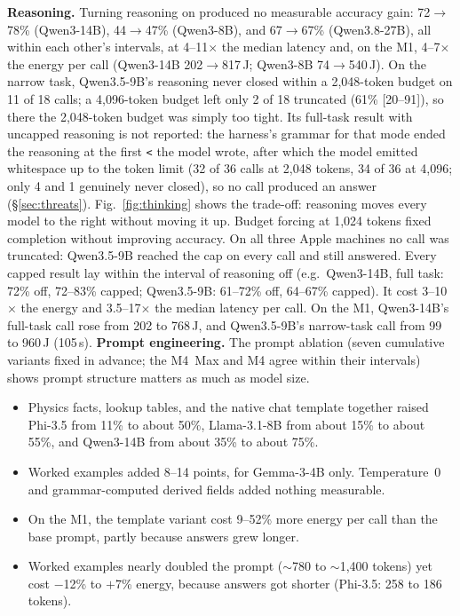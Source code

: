 \documentclass[conference]{IEEEtran}
\begin{document}
\textbf{Reasoning.} Turning reasoning on produced no measurable accuracy gain: 72$\to$78\% (Qwen3-14B), 44$\to$47\% (Qwen3-8B), and 67$\to$67\% (Qwen3.8-27B), all within each other's intervals, at 4--11$\times$ the median latency and, on the M1, 4--7$\times$ the energy per call (Qwen3-14B 202$\to$817\,J; Qwen3-8B 74$\to$540\,J). On the narrow task, Qwen3.5-9B's reasoning never closed within a 2,048-token budget on 11 of 18 calls; a 4,096-token budget left only 2 of 18 truncated (61\% [20--91]), so there the 2,048-token budget was simply too tight. Its full-task result with uncapped reasoning is not reported: the harness's grammar for that mode ended the reasoning at the first \texttt{<} the model wrote, after which the model emitted whitespace up to the token limit (32 of 36 calls at 2,048 tokens, 34 of 36 at 4,096; only 4 and 1 genuinely never closed), so no call produced an answer (\S\ref{sec:threats}). Fig.~\ref{fig:thinking} shows the trade-off: reasoning moves every model to the right without moving it up. Budget forcing at 1,024 tokens fixed completion without improving accuracy. On all three Apple machines no call was truncated: Qwen3.5-9B reached the cap on every call and still answered. Every capped result lay within the interval of reasoning off (e.g.\ Qwen3-14B, full task: 72\% off, 72--83\% capped; Qwen3.5-9B: 61--72\% off, 64--67\% capped). It cost 3--10$\times$ the energy and 3.5--17$\times$ the median latency per call. On the M1, Qwen3-14B's full-task call rose from 202 to 768\,J, and Qwen3.5-9B's narrow-task call from 99 to 960\,J (105\,s). \textbf{Prompt engineering.} The prompt ablation (seven cumulative variants fixed in advance; the M4~Max and M4 agree within their intervals) shows prompt structure matters as much as model size.
\begin{itemize}
\item Physics facts, lookup tables, and the native chat template together raised Phi-3.5 from 11\% to about 50\%, Llama-3.1-8B from about 15\% to about 55\%, and Qwen3-14B from about 35\% to about 75\%.
\item Worked examples added 8--14 points, for Gemma-3-4B only. Temperature~0 and grammar-computed derived fields added nothing measurable.
\item On the M1, the template variant cost 9--52\% more energy per call than the base prompt, partly because answers grew longer.
\item Worked examples nearly doubled the prompt ($\sim$780 to $\sim$1,400 tokens) yet cost $-$12\% to $+$7\% energy, because answers got shorter (Phi-3.5: 258 to 186 tokens).
\end{itemize}
\end{document}
